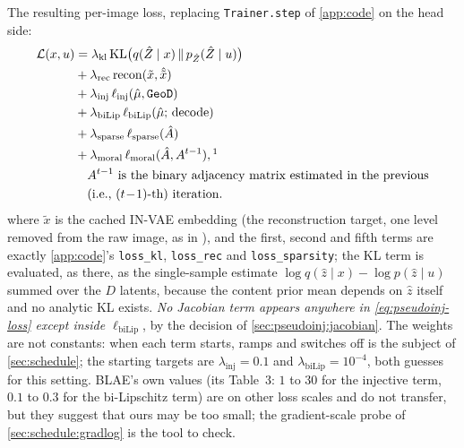 The resulting per-image loss, replacing \texttt{Trainer.step} of \cref{app:code} on the head side:
\begin{equation}
\begin{aligned}
\mathcal L(x,u) &= \lambda_{\mathrm{kl}}\,\mathrm{KL}\bigl(q(\hat Z\mid x)\,\|\,p_{\hat Z}(\hat Z\mid u)\bigr) \\
&+ \lambda_{\mathrm{rec}}\,\mathrm{recon}(\tilde x,\hat{\tilde x}) \\
&+ \lambda_{\mathrm{inj}}\,\ell_{\mathrm{inj}}(\hat\mu,\mathtt{GeoD}) \\
&+ \lambda_{\mathrm{biLip}}\,\ell_{\mathrm{biLip}}(\hat\mu;\,\mathrm{decode}) \\
&+ \lambda_{\mathrm{sparse}}\,\ell_{\mathrm{sparse}}(\hat A) \\
&+ \lambda_{\mathrm{moral}}\,\ell_{\mathrm{moral}}(\hat A, A^{t-1}),\footnotemark\\
&\quad A^{t-1}\ \text{is the binary adjacency matrix estimated in the previous} \\
&\quad \text{(i.e.,}\ (t\!-\!1)\text{-th) iteration}.
\end{aligned}
\label{eq:pseudoinj-loss}
\end{equation}
%
where $\tilde x$ is the cached IN-VAE embedding (the reconstruction target, one level removed from the raw
image, as in ), and the first, second and fifth terms are exactly \cref{app:code}'s
\texttt{loss\_kl}, \texttt{loss\_rec} and \texttt{loss\_sparsity}; the KL term is evaluated, as there,
as the single-sample estimate $\log q(\hat z\mid x)-\log p(\hat z\mid u)$ summed over the $D$ latents,
because the content prior mean depends on $\hat z$ itself and no analytic KL exists.
\emph{No Jacobian term appears anywhere
in \cref{eq:pseudoinj-loss} except inside $\ell_{\mathrm{biLip}}$}, by the decision of
\cref{sec:pseudoinj:jacobian}. The weights are not constants: when each term starts, ramps and
switches off is the subject of \cref{sec:schedule}; the starting targets are $\lambda_{\mathrm{inj}}=0.1$
and $\lambda_{\mathrm{biLip}}=10^{-4}$, both guesses for this setting. BLAE's own values
(its Table~3: $1$ to $30$ for the injective term, $0.1$ to $0.3$ for the bi-Lipschitz
term) are on other loss scales and do not transfer, but they suggest that ours may be too
small; the gradient-scale probe of \cref{sec:schedule:gradlog} is the tool to check.

